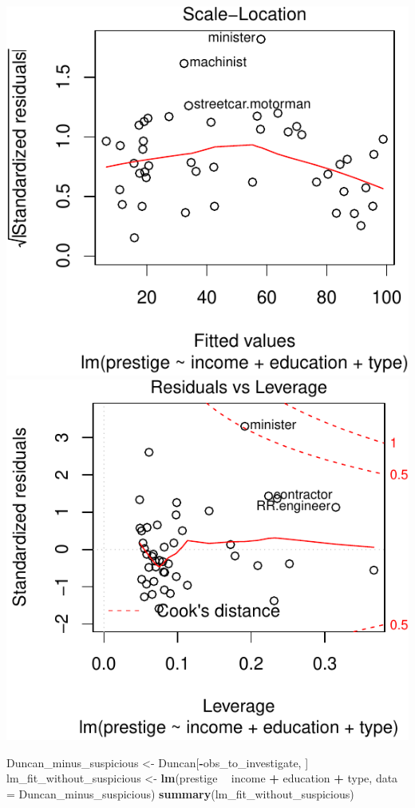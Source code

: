 \documentclass[]{extarticle}
\newenvironment{Shaded}{\begin{snugshade}}{\end{snugshade}}
\newcommand{\KeywordTok}[1]{\textcolor[rgb]{0.13,0.29,0.53}{\textbf{#1}}}
\newcommand{\DataTypeTok}[1]{\textcolor[rgb]{0.13,0.29,0.53}{#1}}
\newcommand{\StringTok}[1]{\textcolor[rgb]{0.31,0.60,0.02}{#1}}
\newcommand{\OperatorTok}[1]{\textcolor[rgb]{0.81,0.36,0.00}{\textbf{#1}}}
\newcommand{\NormalTok}[1]{#1}
\begin{document}
\includegraphics{20190417_avPlots_files/figure-latex/unnamed-chunk-15-3.pdf}
\includegraphics{20190417_avPlots_files/figure-latex/unnamed-chunk-15-4.pdf}

\newpage

\begin{Shaded}
\begin{Highlighting}[]
\NormalTok{Duncan_minus_suspicious <-}\StringTok{ }\NormalTok{Duncan[}\OperatorTok{-}\NormalTok{obs_to_investigate, ]}
\NormalTok{lm_fit_without_suspicious <-}\StringTok{ }\KeywordTok{lm}\NormalTok{(prestige }\OperatorTok{~}\StringTok{ }\NormalTok{income }\OperatorTok{+}\StringTok{ }\NormalTok{education }\OperatorTok{+}\StringTok{ }\NormalTok{type, }\DataTypeTok{data =}\NormalTok{ Duncan_minus_suspicious)}
\KeywordTok{summary}\NormalTok{(lm_fit_without_suspicious)}
\end{Highlighting}
\end{Shaded}
\end{document}
